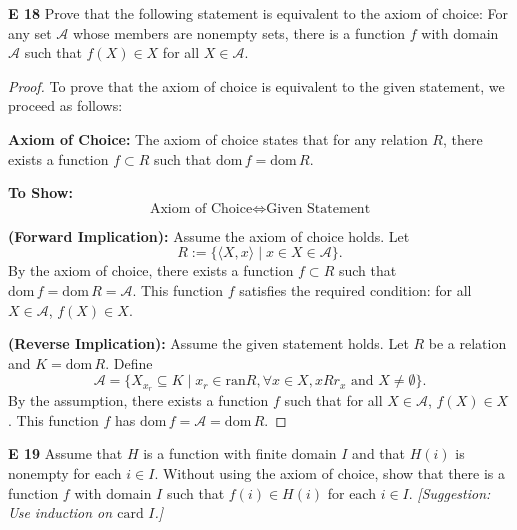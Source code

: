 \begin{question}
    \textbf{E 18} 
    Prove that the following statement is equivalent to the axiom of choice: For any set $\mathcal{A}$ whose members are nonempty sets, there is a function $f$ with domain $\mathcal{A}$ such that $f(X) \in X$ for all $X \in \mathcal{A}$.
\end{question}
\begin{proof}
    To prove that the axiom of choice is equivalent to the given statement, we proceed as follows:

    \textbf{Axiom of Choice:} The axiom of choice states that for any relation \( R \), there exists a function \( f \subset R \) such that \( \mathrm{dom} \, f = \mathrm{dom} \, R \).

    \textbf{To Show:}
    \[
    \text{Axiom of Choice} \iff \text{Given Statement}
    \]

    \textbf{(Forward Implication):} Assume the axiom of choice holds. Let 
    \[
    R := \{ \langle X, x \rangle \mid x \in X \in \mathcal{A} \}.
    \]
    By the axiom of choice, there exists a function \( f \subset R \) such that \( \mathrm{dom} \, f = \mathrm{dom} \, R = \mathcal{A} \). This function \( f \) satisfies the required condition: for all \( X \in \mathcal{A} \), \( f(X) \in X \).

    \textbf{(Reverse Implication):} Assume the given statement holds. Let \( R \) be a relation and \( K = \mathrm{dom} \, R \). Define
    \[
    \mathcal{A} = \{ X_{x_r} \subseteq K \mid x_r \in \mathrm{ran} R, \forall x \in X, xRr_x \text{ and } X \neq \emptyset \}.
    \]
    By the assumption, there exists a function \( f \) such that for all \( X \in \mathcal{A} \), \( f(X) \in X \). This function \( f \) has \( \mathrm{dom} \, f = \mathcal{A} = \mathrm{dom} \, R \).

\end{proof}

\begin{question}
    \textbf{E 19} 
    Assume that $H$ is a function with finite domain $I$ and that $H(i)$ is nonempty for each $i \in I$. Without using the axiom of choice, show that there is a function $f$ with domain $I$ such that $f(i) \in H(i)$ for each $i \in I$. \textit{[Suggestion: Use induction on $\text{card } I$.]}
\end{question}

